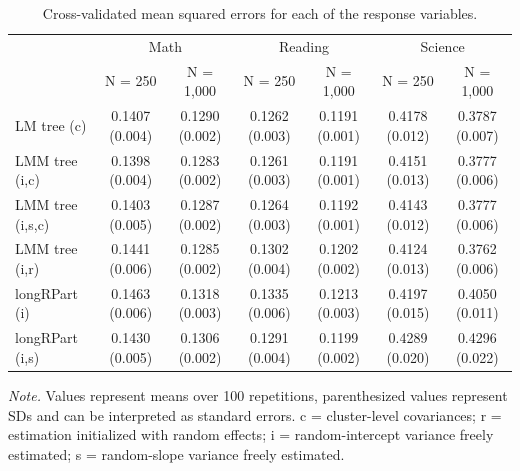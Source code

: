 \documentclass[doc,floatsintext,natbib]{apa7}
\begin{document}
\begin{table}

\begin{threeparttable}
\caption{\label{tab:application_MSEs}Cross-validated mean squared errors for each of the response variables.}
\centering
\fontsize{8}{10}\selectfont
\begin{tabular}[t]{lcccccc}
\toprule
\multicolumn{1}{c}{ } & \multicolumn{2}{c}{Math} & \multicolumn{2}{c}{Reading} & \multicolumn{2}{c}{Science} \\
\cmidrule(l{3pt}r{3pt}){2-3} \cmidrule(l{3pt}r{3pt}){4-5} \cmidrule(l{3pt}r{3pt}){6-7}
\multicolumn{1}{c}{ } & \multicolumn{1}{c}{N = 250} & \multicolumn{1}{c}{N = 1,000} & \multicolumn{1}{c}{N = 250} & \multicolumn{1}{c}{N = 1,000} & \multicolumn{1}{c}{N = 250} & \multicolumn{1}{c}{N = 1,000} \\
\cmidrule(l{3pt}r{3pt}){2-2} \cmidrule(l{3pt}r{3pt}){3-3} \cmidrule(l{3pt}r{3pt}){4-4} \cmidrule(l{3pt}r{3pt}){5-5} \cmidrule(l{3pt}r{3pt}){6-6} \cmidrule(l{3pt}r{3pt}){7-7}
LM tree (c) & 0.1407 (0.004) & 0.1290 (0.002) & 0.1262 (0.003) & 0.1191 (0.001) & 0.4178 (0.012) & 0.3787 (0.007)\\
LMM tree (i,c) & 0.1398 (0.004) & 0.1283 (0.002) & 0.1261 (0.003) & 0.1191 (0.001) & 0.4151 (0.013) & 0.3777 (0.006)\\
LMM tree (i,s,c) & 0.1403 (0.005) & 0.1287 (0.002) & 0.1264 (0.003) & 0.1192 (0.001) & 0.4143 (0.012) & 0.3777 (0.006)\\
LMM tree (i,r) & 0.1441 (0.006) & 0.1285 (0.002) & 0.1302 (0.004) & 0.1202 (0.002) & 0.4124 (0.013) & 0.3762 (0.006)\\
longRPart (i) & 0.1463 (0.006) & 0.1318 (0.003) & 0.1335 (0.006) & 0.1213 (0.003) & 0.4197 (0.015) & 0.4050 (0.011)\\
longRPart (i,s) & 0.1430 (0.005) & 0.1306 (0.002) & 0.1291 (0.004) & 0.1199 (0.002) & 0.4289 (0.020) & 0.4296 (0.022)\\
\bottomrule
\end{tabular}
\begin{tablenotes}
\small
\item [] \footnotesize \textit{Note.} Values represent means over 100 repetitions, parenthesized values represent SDs and can be interpreted as standard errors. c = cluster-level covariances; r = estimation initialized with random effects; i =  random-intercept variance freely estimated; s = random-slope variance freely estimated.
\end{tablenotes}
\end{threeparttable}
\end{table}
\end{document}
